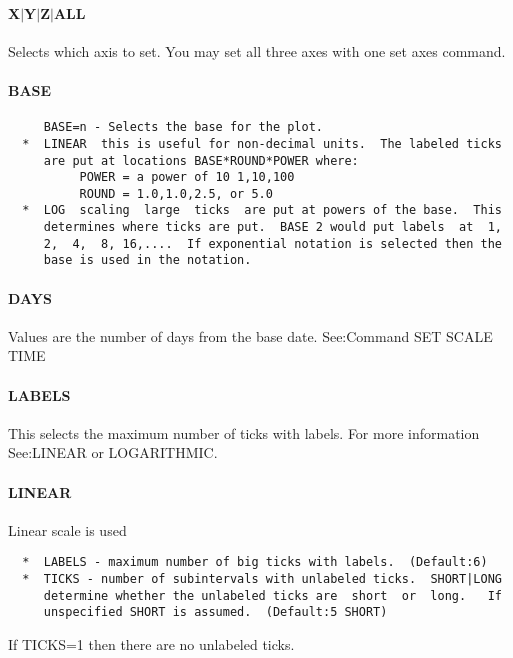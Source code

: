 \paragraph{X$|$Y$|$Z$|$ALL }
Selects  which  axis to set.  You may set all three axes with one set
axes command.  
\paragraph{BASE      }
\begin{verbatim}
     BASE=n - Selects the base for the plot.  
  *  LINEAR  this is useful for non-decimal units.  The labeled ticks
     are put at locations BASE*ROUND*POWER where:  
          POWER = a power of 10 1,10,100 
          ROUND = 1.0,1.0,2.5, or 5.0 
  *  LOG  scaling  large  ticks  are put at powers of the base.  This
     determines where ticks are put.  BASE 2 would put labels  at  1,
     2,  4,  8, 16,....  If exponential notation is selected then the
     base is used in the notation.  
\end{verbatim}
\paragraph{DAYS      }
Values    are    the   number   of   days   from   the   base   date.
See:Command SET SCALE TIME 
\paragraph{LABELS    }
This  selects  the  maximum  number  of  ticks with labels.  For more
information See:LINEAR or LOGARITHMIC.  
\paragraph{LINEAR    }
Linear scale is used 
\begin{verbatim}
  *  LABELS - maximum number of big ticks with labels.  (Default:6) 
  *  TICKS - number of subintervals with unlabeled ticks.  SHORT|LONG
     determine whether the unlabeled ticks are  short  or  long.   If
     unspecified SHORT is assumed.  (Default:5 SHORT) 
\end{verbatim}
If TICKS=1 then there are no unlabeled ticks.  
